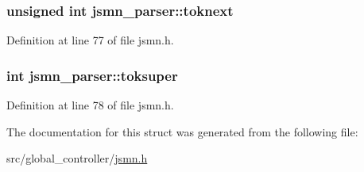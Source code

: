 \hypertarget{structjsmn__parser_af640efd7d154218124a964b65f114bff}{
\subsubsection[{toknext}]{\setlength{\rightskip}{0pt plus 5cm}unsigned int jsmn\-\_\-parser\-::toknext}}\label{structjsmn__parser_af640efd7d154218124a964b65f114bff}


Definition at line 77 of file jsmn.\-h.

\hypertarget{structjsmn__parser_af11fcec48d9f1298909777a12f1d1e39}{
\subsubsection[{toksuper}]{\setlength{\rightskip}{0pt plus 5cm}int jsmn\-\_\-parser\-::toksuper}}\label{structjsmn__parser_af11fcec48d9f1298909777a12f1d1e39}


Definition at line 78 of file jsmn.\-h.



The documentation for this struct was generated from the following file\-:\begin{DoxyCompactItemize}
\item 
src/global\-\_\-controller/\hyperlink{global__controller_2jsmn_8h}{jsmn.\-h}\end{DoxyCompactItemize}
